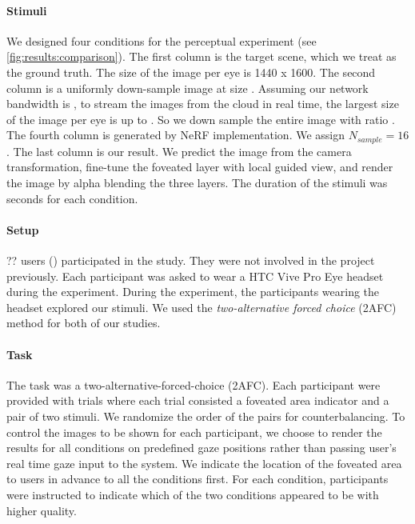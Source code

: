 \paragraph{Stimuli}
We designed four conditions for the perceptual experiment (see \autoref{fig:results:comparison}). The first column is the target scene, which we treat as the ground truth. The size of the image per eye is 1440 x 1600. The second column is a uniformly down-sample image at size . Assuming our network bandwidth is , to stream the images from the cloud in real time, the largest size of the image per eye is up to . So we down sample the entire image with ratio .
The fourth column is generated by NeRF implementation. We assign $N_{sample}=16$. The last column is our result. We predict the image from the camera transformation, fine-tune the foveated layer with local guided view, and render the image by alpha blending the three layers. The duration of the stimuli was  seconds for each condition. 

\paragraph{Setup}
?? users () participated in the study. They were not involved in the project previously. Each participant was asked to wear a HTC Vive Pro Eye headset during the experiment.  During the experiment, the participants wearing the headset explored our stimuli. We used the \textit{two-alternative forced choice} (2AFC) method for both of our studies. 

\paragraph{Task}
The task was a two-alternative-forced-choice (2AFC). 
Each participant were provided with  trials where each trial consisted a foveated area indicator and a pair of two stimuli. We randomize the order of the pairs for counterbalancing. To control the images to be shown for each participant, we choose to render the results for all conditions on predefined gaze positions rather than passing user's real time gaze input to the system. We indicate the location of the foveated area to users in advance to all the conditions first. For each condition, participants were instructed to indicate which of the two conditions appeared to be with higher quality. 

